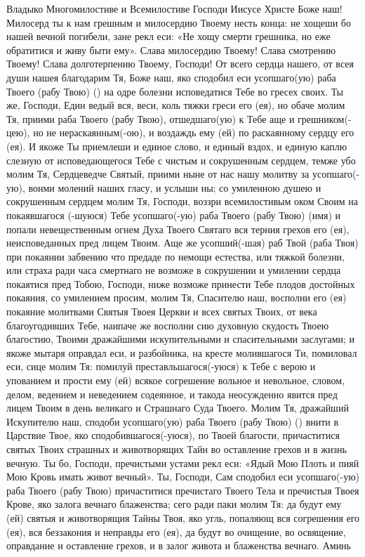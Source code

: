 \begin{mymulticols}
 

Владыко Многомилостиве и Всемилостиве Господи Иисусе Христе Боже наш! Милосерд ты к нам грешным и милосердию Твоему несть конца: не хощеши бо нашей вечной погибели, зане рекл еси: «Не хощу смерти грешника, но еже обратитися и живу быти ему». Слава милосердию Твоему! Слава смотрению Твоему! Слава долготерпению Твоему, Господи! От всего сердца нашего, от всея души нашея благодарим Тя, Боже наш, яко сподобил еси усопшаго(ую) раба Твоего (рабу Твою) () на одре болезни исповедатися Тебе во гресех своих. Ты же, Господи, Един ведый вся, веси, коль тяжки греси его (ея), но обаче молим Тя, приими раба Твоего (рабу Твою), отшедшаго(ую) к Тебе аще и грешником(-цею), но не нераскаянным(-ою), и воздаждь ему (ей) по раскаянному сердцу его (ея). И якоже Ты приемлеши и единое слово, и единый вздох, и единую каплю слезную от исповедающегося Тебе с чистым и сокрушенным сердцем, темже убо молим Тя, Сердцеведче Святый, приими ныне от нас нашу молитву за усопшаго(-ую), вонми молений наших гласу, и услыши ны; со умиленною душею и сокрушенным сердцем молим Тя, Господи, воззри всемилостивым оком Своим на покаявшагося (-шуюся) Тебе усопшаго(-ую) раба Твоего (рабу Твою) (имя) и попали невещественным огнем Духа Твоего Святаго вся терния грехов его (ея), неисповеданных пред лицем Твоим. Аще же усопший(-шая) раб Твой (раба Твоя) при покаянии забвению что предаде по немощи естества, или тяжкой болезни, или страха ради часа смертнаго не возможе в сокрушении и умилении сердца покаятися пред Тобою, Господи, ниже возможе принести Тебе плодов достойных покаяния, со умилением просим, молим Тя, Спасителю наш, восполни его (ея) покаяние молитвами Святыя Твоея Церкви и всех святых Твоих, от века благоугодивших Тебе, наипаче же восполни сию духовную скудость Твоею благостию, Твоими дражайшими искупительными и спасительными заслугами; и якоже мытаря оправдал еси, и разбойника, на кресте молившагося Ти, помиловал еси, сице молим Тя: помилуй преставльшагося(-уюся) к Тебе с верою и упованием и прости ему (ей) всякое согрешение вольное и невольное, словом, делом, ведением и неведением содеянное, и такода неосужденно явится пред лицем Твоим в день великаго и Страшнаго Суда Твоего. Молим Тя, дражайший Искупителю наш, сподоби усопшаго(ую) раба Твоего (рабу Твою) () внити в Царствие Твое, яко сподобившагося(-уюся), по Твоей благости, причаститися святых Твоих страшных и животворящих Тайн во оставление грехов и в жизнь вечную. Ты бо, Господи, пречистыми устами рекл еси: «Ядый Мою Плоть и пияй Мою Кровь имать живот вечный». Ты, Господи, Сам сподобил еси усопшаго(-ую) раба Твоего (рабу Твою) причаститися пречистаго Твоего Тела и пречистыя Твоея Крове, яко залога вечнаго блаженства; сего ради паки молим Тя: да будут ему (ей) святыя и животворящия Тайны Твоя, яко угль, попаляющ вся согрешения его (ея), вся беззакония и неправды его (ея), да будут во очищение, во освящение, оправдание и оставление грехов, и в залог живота и блаженства вечнаго. Аминь 

\end{mymulticols}

